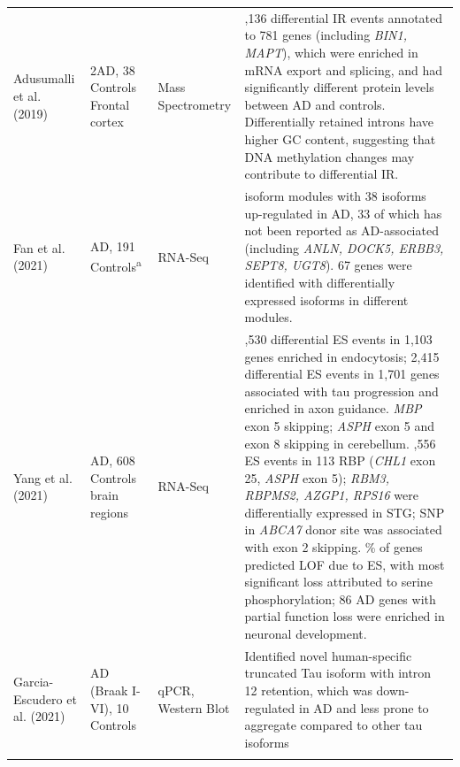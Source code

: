 \begin{landscape}
\begin{longtable}[c]{p{3cm}p{4cm}p{3cm}p{16cm}}
		\centering Adusumalli et al. (2019) \cite{Adusumalli2019} &
		\centering 4 2AD, 38 Controls\cite{Bai2013} \newline Frontal cortex &
		\centering Mass Spectrometry &
		\tabitem 1,136 differential IR events annotated to 781 genes (including \textit{BIN1, MAPT}), which were enriched in mRNA export and splicing, and had significantly different protein levels between AD and controls. \newline
		\tabitem Differentially retained introns have higher GC content, suggesting that DNA methylation changes may contribute to differential IR. \\
		\hdashline[0.5pt/5pt]
		
		\centering Fan et al. (2021) \cite{Fan2021} &
		\centering 210 AD, 191 Controls\textsuperscript{a} &
		\centering RNA-Seq &
		\tabitem 2 isoform modules with 38 isoforms up-regulated in AD, 33 of which has not been reported as AD-associated (including \textit{ANLN, DOCK5, ERBB3, SEPT8, UGT8}). 67 genes were identified with differentially expressed isoforms in different modules. \\
		\hdashline[0.5pt/5pt]
		
		\centering Yang et al. (2021) \cite{Yang2021} &
		\centering 1074 AD, 608 Controls \newline 9 brain regions&
		\centering RNA-Seq & 
		\tabitem 1,530 differential ES events in 1,103 genes enriched in endocytosis; 2,415 differential ES events in 1,701 genes associated with tau progression and enriched in axon guidance. \newline 
		\tabitem \textit{MBP} exon 5 skipping; \textit{ASPH} exon 5 and exon 8 skipping in cerebellum. \newline  
		\tabitem 15,556 ES events in 113 RBP (\textit{CHL1} exon 25, \textit{ASPH} exon 5); \textit{RBM3, RBPMS2, AZGP1, RPS16} were differentially expressed in STG; SNP in \textit{ABCA7} donor site was associated with exon 2 skipping. \newline 
		\tabitem 70\% of genes predicted LOF due to ES, with most significant loss attributed to serine phosphorylation; 86 AD genes with partial function loss were enriched in neuronal development.	\\
		\hdashline[0.5pt/5pt]		
		
		\centering Garcia-Escudero et al. (2021) \cite{Garcia-Escudero2021} &
		\centering 32 AD (Braak I-VI), 10 Controls &
		\centering qPCR, Western Blot &
		\tabitem Identified novel human-specific truncated Tau isoform with intron 12 retention, which was down-regulated in AD and less prone to aggregate compared to other tau isoforms \\
		\hdashline[0.5pt/5pt]
		

\end{longtable}
\end{landscape}
